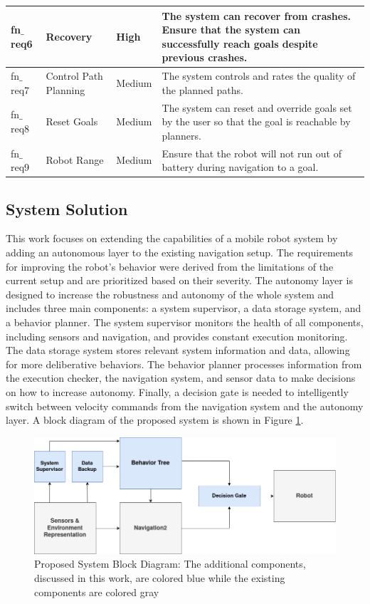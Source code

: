 \documentclass[letterpaper, 10pt, conference]{ieeeconf}
\begin{document}
\begin{table}[ht]
\begin{tabular}{|m{}|m{}|m{}|m{}|}
			\hline
			fn$\_$req6 & Recovery & High & The system can recover from crashes. Ensure that the system can successfully reach goals despite previous crashes.\\ 
			\hline 
			fn$\_$req7 & Control Path Planning & Medium & The system controls and rates the quality of the planned paths. \\
			\hline	
			fn$\_$req8 & Reset Goals & Medium & The system can reset and override goals set by the user so that the goal is reachable by planners. \\
			\hline
			fn$\_$req9 & Robot Range & Medium & Ensure that the robot will not run out of battery during navigation to a goal. \\	
			\hline
		\end{tabular}
\end{table}

\subsection{System Solution}

This work focuses on extending the capabilities of a mobile robot system by adding an autonomous layer to the existing navigation setup. The requirements for improving the robot's behavior were derived from the limitations of the current setup and are prioritized based on their severity. The autonomy layer is designed to increase the robustness and autonomy of the whole system and includes three main components: a system supervisor, a data storage system, and a behavior planner. The system supervisor monitors the health of all components, including sensors and navigation, and provides constant execution monitoring. The data storage system stores relevant system information and data, allowing for more deliberative behaviors. The behavior planner processes information from the execution checker, the navigation system, and sensor data to make decisions on how to increase autonomy. Finally, a decision gate is needed to intelligently switch between velocity commands from the navigation system and the autonomy layer. A block diagram of the proposed system is shown in Figure \ref{fig:block_diagram}.

\begin{figure}[ht]
	\centering 
	\includegraphics[width=0.9\linewidth]{Figures/block_diagram.png}
	\caption{Proposed System Block Diagram: The additional components, discussed in this work, are colored blue while the existing components are colored gray}
	\label{fig:block_diagram}
\end{figure}
\end{document}
